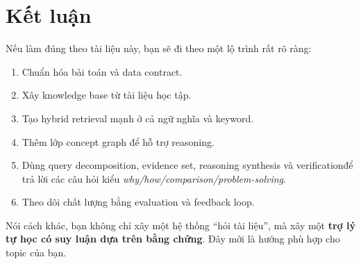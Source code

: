 \documentclass[12pt,a4paper]{article}
\begin{document}
\section{Kết luận}

Nếu làm đúng theo tài liệu này, bạn sẽ đi theo một lộ trình rất rõ ràng:
\begin{enumerate}[label=\arabic*.]
    \item Chuẩn hóa bài toán và data contract.
    \item Xây knowledge base từ tài liệu học tập.
    \item Tạo hybrid retrieval mạnh ở cả ngữ nghĩa và keyword.
    \item Thêm lớp concept graph để hỗ trợ reasoning.
    \item Dùng query decomposition, evidence set, reasoning synthesis và verification\newline để trả lời các câu hỏi kiểu \textit{why/how/comparison/problem-solving}.
    \item Theo dõi chất lượng bằng evaluation và feedback loop.
\end{enumerate}

Nói cách khác, bạn không chỉ xây một hệ thống ``hỏi tài liệu'', mà xây một \textbf{trợ lý tự học có suy luận dựa trên bằng chứng}. Đây mới là hướng phù hợp cho topic của bạn.
\end{document}
